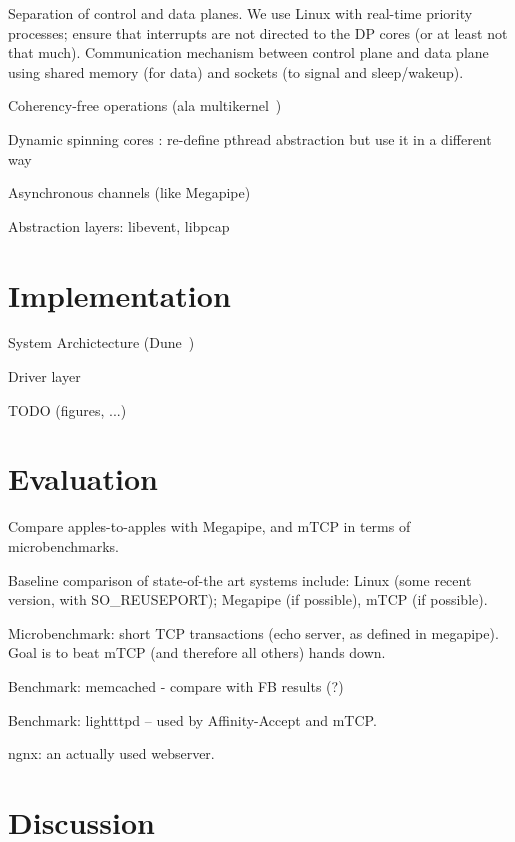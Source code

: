 

\todo Separation of control and data planes.  We use Linux with
real-time priority processes; ensure that interrupts are not directed
to the DP cores (or at least not that much).  Communication mechanism
between control plane and data plane using shared memory (for data)
and sockets (to signal and sleep/wakeup).


\todo Coherency-free operations  (ala multikernel~\cite{DBLP:conf/sosp/BaumannBDHIPRSS09})

\todo Dynamic spinning cores : re-define pthread abstraction but use it in a different way

\todo Asynchronous channels (like Megapipe)

\todo Abstraction layers: libevent, libpcap


\section{Implementation}




\todo System Archictecture (Dune~\cite{belay2012dune})

\todo Driver layer

\todo TODO (figures, ...)

\section{Evaluation}


\todo Compare apples-to-apples with Megapipe, and mTCP in terms of microbenchmarks.

\todo Baseline comparison of state-of-the art systems include:  Linux (some recent version, with SO\_REUSEPORT); Megapipe (if possible), mTCP (if possible). 

\todo Microbenchmark: short TCP transactions (echo server, as defined in megapipe).   Goal is to beat mTCP (and therefore all others) hands down.

\todo Benchmark: memcached - compare with FB results (?)

\todo Benchmark: lightttpd -- used by Affinity-Accept and mTCP.  

\todo ngnx: an actually used webserver.


\section{Discussion}

